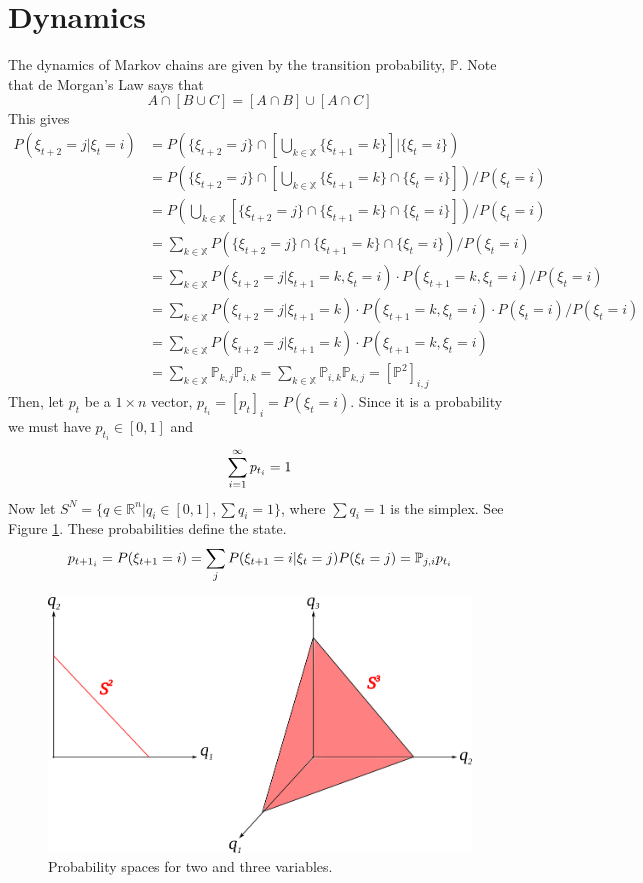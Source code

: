 \section{Dynamics}
The dynamics of Markov chains are given by the transition probability, $\mathbb{P}$. Note that de Morgan's Law says that
$$A\cap[B\cup C] = [A\cap B] \cup [A\cap C]$$
This gives
\begin{align*}
P\left(\xi_{t+2}=j | \xi_t=i\right) &= P\left(\{\xi_{t+2}=j\} \cap \left[\bigcup_{k\in\mathbb{X}}\{\xi_{t+1}=k\}\right] | \{\xi_t=i\}\right) \\
&= P\left(\{\xi_{t+2}=j\} \cap \left[\bigcup_{k\in\mathbb{X}}\{\xi_{t+1}=k\} \cap \{\xi_t=i\}\right]\right) / P(\xi_t=i) \\
&= P\left(\bigcup_{k\in\mathbb{X}}[\{\xi_{t+2}=j\} \cap \{\xi_{t+1}=k\} \cap \{\xi_t=i\}]\right) / P(\xi_t=i) \\
&= \sum_{k\in\mathbb{X}} P(\{\xi_{t+2}=j\} \cap \{\xi_{t+1}=k\} \cap \{\xi_t=i\}) / P(\xi_t=i) \\
&= \sum_{k\in\mathbb{X}} P(\xi_{t+2}=j | \xi_{t+1}=k,\xi_t=i) \cdot P(\xi_{t+1}=k,\xi_t=i) / P(\xi_t=i) \\
&= \sum_{k\in\mathbb{X}} P(\xi_{t+2}=j | \xi_{t+1}=k) \cdot P(\xi_{t+1}=k,\xi_t=i) \cdot P(\xi_t=i) / P(\xi_t=i) \\
&= \sum_{k\in\mathbb{X}} P(\xi_{t+2}=j | \xi_{t+1}=k) \cdot P(\xi_{t+1}=k,\xi_t=i) \\
&= \sum_{k\in\mathbb{X}} \mathbb{P}_{k,j}\mathbb{P}_{i,k} = \sum_{k\in\mathbb{X}} \mathbb{P}_{i,k}\mathbb{P}_{k,j} = \left[\mathbb{P}^2\right]_{i,j}
\end{align*}
Then, let $p_t$ be a $1\times n$ vector, $p_{t_i}=[p_t]_i=P(\xi_t=i)$. Since it is a probability we must have $p_{t_i}\in[0,1]$ and
$$\sum_{i=1}^\infty p_{t_i}=1$$
Now let $S^N=\{q\in\mathbb{R}^n|q_i\in[0,1],\sum q_i=1\}$, where $\sum q_i=1$ is the simplex. See Figure \ref{fig:09s2s3}. These probabilities define the state.
$$p_{{t+1}_i} = P(\xi_{t+1}=i) = \sum_jP(\xi_{t+1}=i|\xi_t=j)P(\xi_t=j) = \mathbb{P}_{j,i} p_{t_i}$$

\begin{figure}[ht!]
	\centering
	\includegraphics[width=.4\textwidth]{images/09s2s3}
	\caption{Probability spaces for two and three variables.}
	\label{fig:09s2s3}
\end{figure}

